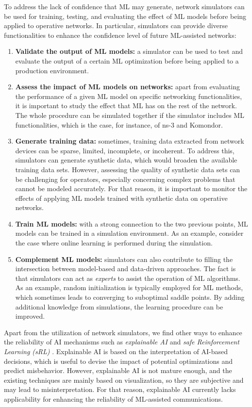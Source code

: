 \documentclass[journal]{IEEEtran}
\begin{document}
	To address the lack of confidence that ML may generate, network simulators can be used for training, testing, and evaluating the effect of ML models before being applied to operative networks. In particular, simulators can provide diverse functionalities to enhance the confidence level of future ML-assisted networks: 
	\begin{enumerate}
		\item \textbf{Validate the output of ML models:} a simulator can be used to test and evaluate the output of a certain ML optimization before being applied to a production environment. 
		\item \textbf{Assess the impact of ML models on networks:} apart from evaluating the performance of a given ML model on specific networking functionalities, it is important to study the effect that ML has on the rest of the network. The whole procedure can be simulated together if the simulator includes ML functionalities, which is the case, for instance, of ns-3 and Komondor.
		\item \textbf{Generate training data:} sometimes, training data extracted from network devices can be sparse, limited, incomplete, or incoherent. To address this, simulators can generate synthetic data, which would broaden the available training data sets. However, assessing the quality of synthetic data sets can be challenging for operators, especially concerning complex problems that cannot be modeled accurately. For that reason, it is important to monitor the effects of applying ML models trained with synthetic data on operative networks.
		\item \textbf{Train ML models:} with a strong connection to the two previous points, ML models can be trained in a simulation environment. As an example, consider the case where online learning is performed during the simulation.
		\item \textbf{Complement ML models:} simulators can also contribute to filling the intersection between model-based and data-driven approaches. The fact is that simulators can act as \textit{experts} to assist the operation of ML algorithms. As an example, random initialization is typically employed for ML methods, which sometimes leads to converging to suboptimal saddle points. By adding additional knowledge from simulations, the learning procedure can be improved.
	\end{enumerate}

	Apart from the utilization of network simulators, we find other ways to enhance the reliability of AI mechanisms such as \textit{explainable AI} \cite{samek} and \textit{safe Reinforcement Learning (sRL)} \cite{safe}. Explainable AI is based on the interpretation of AI-based decisions, which is useful to devise the impact of potential optimizations and predict misbehavior. However, explainable AI is not mature enough, and the existing techniques are mainly based on visualization, so they are subjective and may lead to misinterpretation. For that reason, explainable AI currently lacks applicability for enhancing the reliability of ML-assisted communications. 
	
\end{document}
